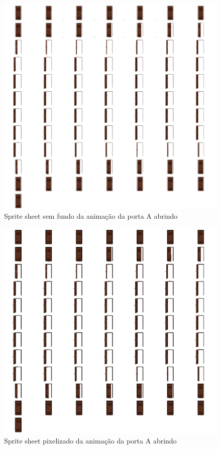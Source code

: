 \begin{figure}[htbp]
    \centering
    \caption{\small Sprite sheet sem fundo da animação da porta A abrindo}
    \label{fig:geminiProPortaASpriteSheetSemFundo}
    \includegraphics[width=0.5\linewidth]{figs/geminiPro/sprite sheet/door_spriteSheet_semFundo-Photoroom.png}
\end{figure}

\begin{figure}[htbp]
    \centering
    \caption{\small Sprite sheet pixelizado da animação da porta A abrindo}
    \label{fig:geminiProPortaASpriteSheetPixel}
    \includegraphics[width=0.8\linewidth]{figs/geminiPro/sprite sheet/door_fundo_transparente_pixel.png}
\end{figure}



